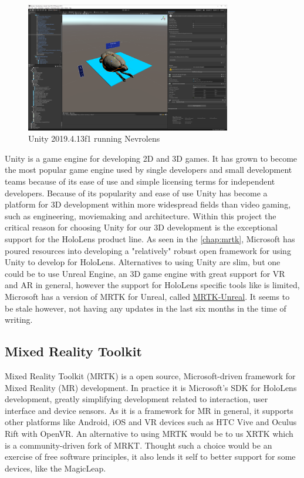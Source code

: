 \begin{figure}[ht]
    \centering
    \includegraphics[width=0.8\textwidth]{fig/unity_example.png}
    \caption{Unity 2019.4.13f1 running Nevrolens}
\end{figure}

Unity is a game engine for developing 2D and 3D games. It has grown to become the most popular game engine used by single developers and small development teams because of its ease of use and simple licensing terms for independent developers. Because of its popularity  and ease of use Unity has become a platform for 3D development within more widespread fields than video gaming, such as engineering, moviemaking and architecture. 
Within this project the critical reason for choosing Unity for our 3D development is the exceptional support for the HoloLens product line. As seen in the \autoref{chap:mrtk}, Microsoft has poured resources into developing a "relatively" robust open framework for using Unity to develop for HoloLens. 
Alternatives to using Unity are slim, but one could be to use Unreal Engine, an 3D game engine with great support for VR and AR in general, however the support for HoloLens specific tools like  is limited, Microsoft has a version of MRTK for Unreal, called \href{https://github.com/microsoft/MixedRealityToolkit-Unreal}{MRTK-Unreal}. It seems to be stale however, not having any updates in the last six months in the time of writing.

\subsection*{Mixed Reality Toolkit}\label{chap:mrtk}
Mixed Reality Toolkit (MRTK) is a open source, Microsoft-driven framework for Mixed Reality (MR) development. In practice it is Microsoft's SDK for HoloLens development, greatly simplifying development related to interaction, user interface and device sensors. As it is a framework for MR in general, it supports other platforms like Android, iOS and VR devices such as HTC Vive and Oculus Rift with OpenVR. 
An alternative to using MRTK would be to us XRTK which is a community-driven fork of MRKT. Thought such a choice would be an exercise of free software principles, it also lends it self to better support for some devices, like the MagicLeap.



